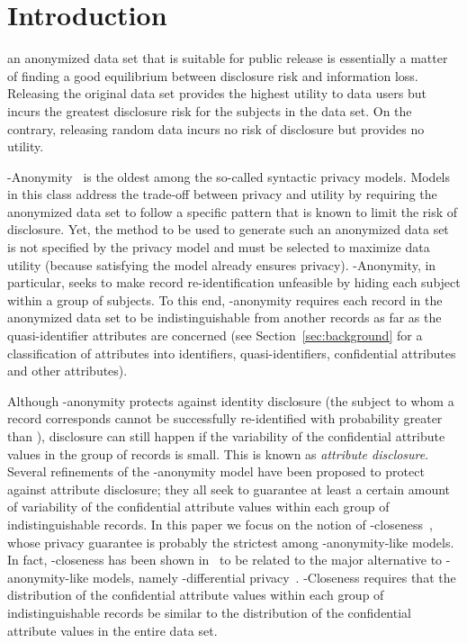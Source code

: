 \documentclass[10pt,journal,compsoc]{IEEEtran}
\theoremstyle{definition}
\theoremstyle{plain}
\begin{document}
\maketitle


\IEEEpeerreviewmaketitle



\section{Introduction}
\label{sec1}
 an anonymized data set that is suitable for public
release is essentially a matter of finding a good equilibrium between
disclosure risk and information loss. Releasing the original data
set provides the highest utility to data users but incurs the greatest
disclosure risk for the subjects in the data set. On the contrary,
releasing random data incurs no risk of disclosure but provides
no utility. 

-Anonymity~\cite{Samarati1998Protecting,Sweeney2002kAnonymity}
is the oldest among 
the so-called syntactic privacy models.  
Models in this class address the trade-off between privacy and
utility by requiring the anonymized data set to follow a specific
pattern that is known to limit the risk of disclosure. Yet, the method
to be used to generate such an anonymized data set is not specified by the
privacy model and must be selected to maximize data utility (because
satisfying the model already ensures privacy). -Anonymity,
in particular, seeks to make record re-identification unfeasible by
hiding each subject within a group of  subjects. To this end,
-anonymity requires each record in the anonymized data set to
be indistinguishable from another  records as far as the
quasi-identifier attributes are
 concerned (see Section~\ref{sec:background} for a classification
of attributes into identifiers, quasi-identifiers, confidential 
attributes and other attributes).


Although -anonymity protects against identity disclosure (the
subject to whom a record corresponds 
cannot be successfully re-identified with probability
greater than ), disclosure can still happen if the variability
of the confidential attribute values 
in the group of  records is small. This
is known as \emph{attribute disclosure}. Several refinements of the
-anonymity model have been proposed to protect against attribute
disclosure;
they all seek to
guarantee at least a certain amount of variability of
the confidential attribute values
within each group of indistinguishable records. In this paper we focus
on the notion of -closeness~\cite{Li2007t-Closeness}, whose
privacy guarantee is probably the strictest
among -anonymity-like models. In fact,
-closeness has been
shown in~\cite{Soria2013differential,DomingoSoria15} to be related
to the major alternative
to -anonymity-like models, namely -differential 
privacy~\cite{Dwork06}.
-Closeness requires that the distribution
of the confidential attribute values 
within each group of indistinguishable records be
similar to the distribution of the confidential 
attribute values in the entire data set.
\end{document}
